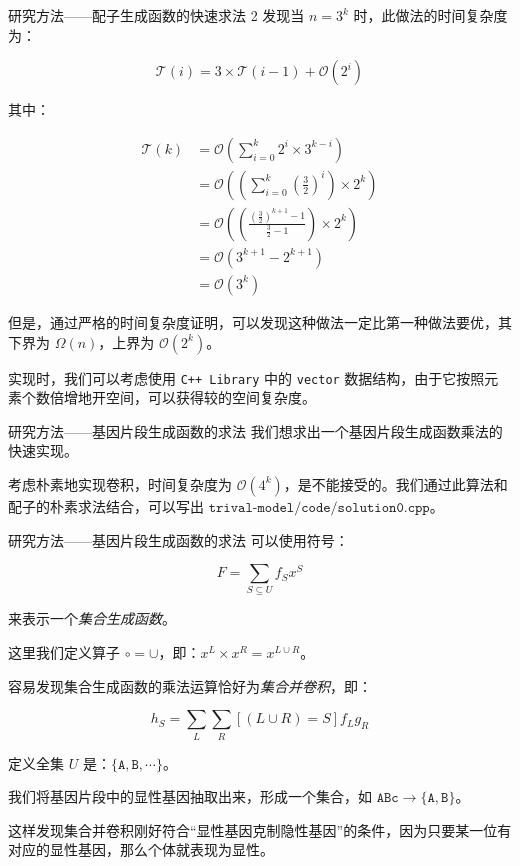\documentclass[10pt,aspectratio=43,mathserif]{ctexbeamer}
\begin{document}
	\begin{frame}{研究方法——配子生成函数的快速求法 2}
		发现当 $n=3^k$ 时，此做法的时间复杂度为：
		
		$$\mathcal T(i)=3 \times \mathcal T(i-1) + \mathcal O(2^i)$$
		
		其中：
		
		$$
		\begin{aligned}
			\mathcal T(k) &= \mathcal O\left(\sum_{i=0}^k 2^i \times 3^{k-i} \right) \\
			&= \mathcal O\left( \left (\sum_{i=0}^k (\frac{3}{2})^i \right) \times 2^k \right) \\
			&= \mathcal O\left( \left(\frac{\left(\frac{3}{2}\right)^{k+1}-1}{\frac{3}{2}-1}\right) \times 2^k\right) \\
			&= \mathcal O(3^{k+1} - 2^{k+1}) \\
			&= \mathcal O(3^k)
		\end{aligned}
		$$
		
		但是，通过严格的时间复杂度证明，可以发现这种做法一定比第一种做法要优，其下界为 $\Omega(n)$，上界为 $\mathcal O(2^k)$。
		
		实现时，我们可以考虑使用 \texttt{C++ Library} 中的 \texttt{vector} 数据结构，由于它按照元素个数倍增地开空间，可以获得较的空间复杂度。
	\end{frame}

	\begin{frame}{研究方法——基因片段生成函数的求法}
		我们想求出一个基因片段生成函数乘法的快速实现。
		
		考虑朴素地实现卷积，时间复杂度为 $\mathcal O(4^k)$，是不能接受的。我们通过此算法和配子的朴素求法结合，可以写出 $\texttt{trival-model/code/solution0.cpp}$。
		
	\end{frame}

	\begin{frame}{研究方法——基因片段生成函数的求法}
		可以使用符号：
		
		$$F=\sum_{S \subseteq U} f_S x^S$$
		
		来表示一个\textsl{集合生成函数}。
		
		这里我们定义算子 $\circ=\cup$，即：$x^L \times x^R=x^{L \cup R}$。
		
		容易发现集合生成函数的乘法运算恰好为\textsl{集合并卷积}，即：
		
		$$h_S =\sum_{L} \sum_{R} [(L \cup R) = S] f_L g_R$$
		
		定义全集 $U$ 是：$\{\texttt{A},\texttt{B},\cdots\}$。
		
		我们将基因片段中的显性基因抽取出来，形成一个集合，如 $\texttt{ABc} \to \{\texttt{A},\texttt{B}\}$。
		
		这样发现集合并卷积刚好符合“显性基因克制隐性基因”的条件，因为只要某一位有对应的显性基因，那么个体就表现为显性。
	\end{frame}
\end{document}
